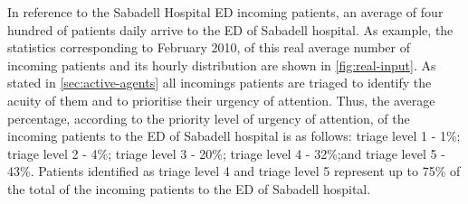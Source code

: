 \documentclass[11pt]{article} %
\begin{document}
In reference to the Sabadell Hospital ED incoming patients, an average
of four hundred of patients daily arrive to the ED of Sabadell hospital.
As example, the statistics corresponding to February 2010, of this
real average number of incoming patients and its hourly distribution
are shown in \ref{fig:real-input}. As stated in \ref{sec:active-agents}
all incomings patients are triaged to identify the acuity of them
and to prioritise their urgency of attention. Thus, the average percentage,
according to the priority level of urgency of attention, of the incoming
patients to the ED of Sabadell hospital is as follows: triage level
1 - 1\%; triage level 2 - 4\%; triage level 3 - 20\%; triage level
4 - 32\%;and triage level 5 - 43\%. Patients identified as triage
level 4 and triage level 5 represent up to 75\% of the total of the
incoming patients to the ED of Sabadell hospital.

\end{document}

